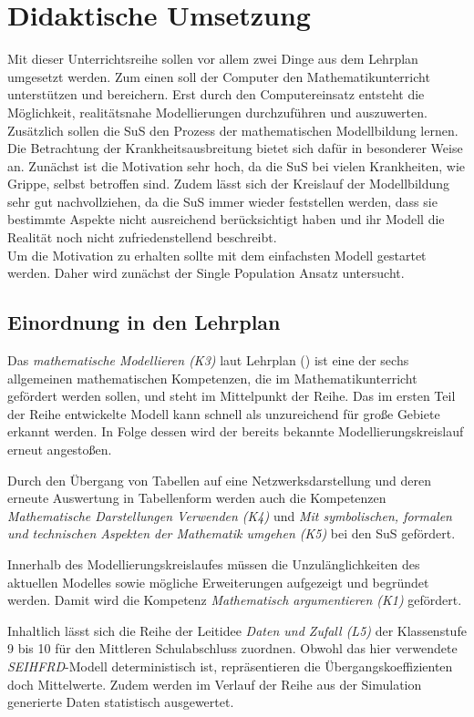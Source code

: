 \section{Didaktische Umsetzung}
\ellen
Mit dieser Unterrichtsreihe sollen vor allem zwei Dinge aus dem Lehrplan umgesetzt werden. Zum einen soll der Computer den Mathematikunterricht unterstützen und bereichern. Erst durch den Computereinsatz entsteht die Möglichkeit, realitätsnahe Modellierungen durchzuführen und auszuwerten. \\
Zusätzlich sollen die SuS den Prozess der mathematischen Modellbildung lernen. Die Betrachtung der Krankheitsausbreitung bietet sich dafür in besonderer Weise an. Zunächst ist die Motivation sehr hoch, da die SuS bei vielen Krankheiten, wie Grippe, selbst betroffen sind. Zudem lässt sich der Kreislauf der Modellbildung sehr gut nachvollziehen, da die SuS immer wieder feststellen werden, dass sie bestimmte Aspekte nicht ausreichend berücksichtigt haben und ihr Modell die Realität noch nicht zufriedenstellend beschreibt.\\
Um die Motivation zu erhalten sollte mit dem einfachsten Modell gestartet werden. Daher wird zunächst der Single Population Ansatz untersucht.
\subsection{Einordnung in den Lehrplan}
\steffen
Das \emph{mathematische Modellieren (K3)} laut Lehrplan (\cite{lpsek1}) ist eine der sechs allgemeinen mathematischen Kompetenzen, die im Mathematikunterricht gefördert werden sollen, und steht im Mittelpunkt der Reihe. Das im ersten Teil der Reihe entwickelte Modell kann schnell als unzureichend für große Gebiete erkannt werden. In Folge dessen wird der bereits bekannte Modellierungskreislauf erneut angestoßen. 

Durch den Übergang von Tabellen auf eine Netzwerksdarstellung und deren erneute Auswertung in Tabellenform werden auch die Kompetenzen \emph{Mathematische Darstellungen Verwenden (K4)} und \emph{Mit symbolischen, formalen und technischen Aspekten der Mathematik umgehen (K5)} bei den SuS gefördert. 

Innerhalb des Modellierungskreislaufes müssen die Unzulänglichkeiten des aktuellen Modelles sowie mögliche Erweiterungen aufgezeigt und begründet werden. Damit wird die Kompetenz \emph{Mathematisch argumentieren (K1)} gefördert.

Inhaltlich lässt sich die Reihe der Leitidee \emph{Daten und Zufall (L5)} der Klassenstufe 9 bis 10 für den Mittleren Schulabschluss zuordnen. Obwohl das hier verwendete \emph{SEIHFRD}-Modell deterministisch ist, repräsentieren die Übergangskoeffizienten doch Mittelwerte. Zudem werden im Verlauf der Reihe aus der Simulation generierte Daten statistisch ausgewertet. 


